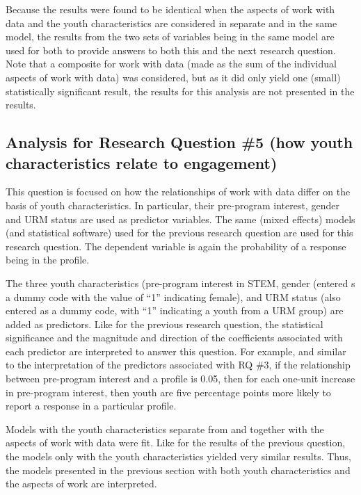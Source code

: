 \documentclass[]{book}
\theoremstyle{definition}
\theoremstyle{definition}
\theoremstyle{definition}
\theoremstyle{remark}
\begin{document}
Because the results were found to be identical when the aspects of work
with data and the youth characteristics are considered in separate and
in the same model, the results from the two sets of variables being in
the same model are used for both to provide answers to both this and the
next research question. Note that a composite for work with data (made
as the sum of the individual aspects of work with data) was considered,
but as it did only yield one (small) statistically significant result,
the results for this analysis are not presented in the results.

\subsection{Analysis for Research Question \#5 (how youth
characteristics relate to
engagement)}\label{analysis-for-research-question-5-how-youth-characteristics-relate-to-engagement}

This question is focused on how the relationships of work with data
differ on the basis of youth characteristics. In particular, their
pre-program interest, gender and URM status are used as predictor
variables. The same (mixed effects) models (and statistical software)
used for the previous research question are used for this research
question. The dependent variable is again the probability of a response
being in the profile.

The three youth characteristics (pre-program interest in STEM, gender
(entered s a dummy code with the value of ``1'' indicating female), and
URM status (also entered as a dummy code, with ``1'' indicating a youth
from a URM group) are added as predictors. Like for the previous
research question, the statistical significance and the magnitude and
direction of the coefficients associated with each predictor are
interpreted to answer this question. For example, and similar to the
interpretation of the predictors associated with RQ \#3, if the
relationship between pre-program interest and a profile is 0.05, then
for each one-unit increase in pre-program interest, then youth are five
percentage points more likely to report a response in a particular
profile.

Models with the youth characteristics separate from and together with
the aspects of work with data were fit. Like for the results of the
previous question, the models only with the youth characteristics
yielded very similar results. Thus, the models presented in the previous
section with both youth characteristics and the aspects of work are
interpreted.
\end{document}
